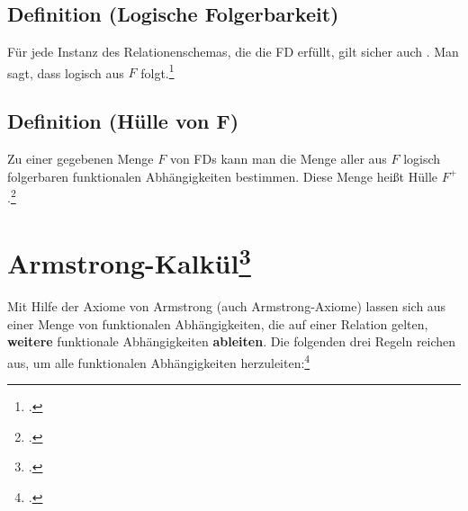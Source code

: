 \documentclass{lehramt-informatik-haupt}
\begin{document}
%

\subsection{Definition (Logische Folgerbarkeit)}

Für jede Instanz des Relationenschemas, die die FD  erfüllt, gilt sicher auch
. Man sagt, dass 
logisch aus $F$ folgt.\footcite[Seite 171]{winter}

%

\subsection{Definition (Hülle von F)}

Zu einer gegebenen Menge $F$ von FDs kann man die Menge aller aus $F$
logisch folgerbaren funktionalen Abhängigkeiten bestimmen. Diese Menge
heißt Hülle $F^+$.\footcite[Seite 171]{winter}

%

\section{Armstrong-Kalkül\footcite[Axiome von Armstrong]{wiki:funktionale-abhängigkeit}}

Mit Hilfe der Axiome von Armstrong (auch Armstrong-Axiome) lassen sich
aus einer Menge von funktionalen Abhängigkeiten, die auf einer Relation
gelten, \textbf{weitere} funktionale Abhängigkeiten \textbf{ableiten}.
Die folgenden drei Regeln reichen aus, um alle funktionalen
Abhängigkeiten herzuleiten:\footcite[Seite 14]{db:fs:}
\end{document}
